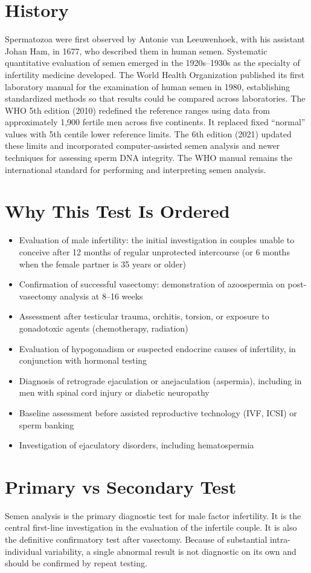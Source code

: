 \section*{History}
Spermatozoa were first observed by Antonie van Leeuwenhoek, with his assistant Johan Ham, in 1677, who described them in human semen. Systematic quantitative evaluation of semen emerged in the 1920s--1930s as the specialty of infertility medicine developed. The World Health Organization published its first laboratory manual for the examination of human semen in 1980, establishing standardized methods so that results could be compared across laboratories. The WHO 5th edition (2010) redefined the reference ranges using data from approximately 1,900 fertile men across five continents. It replaced fixed ``normal'' values with 5th centile lower reference limits. The 6th edition (2021) updated these limits and incorporated computer-assisted semen analysis and newer techniques for assessing sperm DNA integrity. The WHO manual remains the international standard for performing and interpreting semen analysis.
\section*{Why This Test Is Ordered}
\begin{itemize}
  \item Evaluation of male infertility: the initial investigation in couples unable to conceive after 12 months of regular unprotected intercourse (or 6 months when the female partner is 35 years or older)
  \item Confirmation of successful vasectomy: demonstration of azoospermia on post-vasectomy analysis at 8--16 weeks
  \item Assessment after testicular trauma, orchitis, torsion, or exposure to gonadotoxic agents (chemotherapy, radiation)
  \item Evaluation of hypogonadism or suspected endocrine causes of infertility, in conjunction with hormonal testing
  \item Diagnosis of retrograde ejaculation or anejaculation (aspermia), including in men with spinal cord injury or diabetic neuropathy
  \item Baseline assessment before assisted reproductive technology (IVF, ICSI) or sperm banking
  \item Investigation of ejaculatory disorders, including hematospermia
\end{itemize}
\section*{Primary vs Secondary Test}
Semen analysis is the primary diagnostic test for male factor infertility. It is the central first-line investigation in the evaluation of the infertile couple. It is also the definitive confirmatory test after vasectomy. Because of substantial intra-individual variability, a single abnormal result is not diagnostic on its own and should be confirmed by repeat testing.
